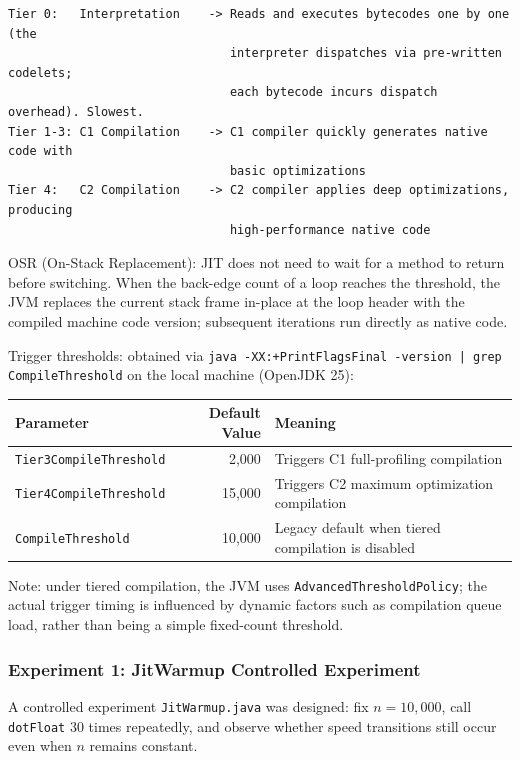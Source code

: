 \documentclass[12pt,a4paper]{article}
\begin{document}
\begin{lstlisting}
Tier 0:   Interpretation    -> Reads and executes bytecodes one by one (the
                               interpreter dispatches via pre-written codelets;
                               each bytecode incurs dispatch overhead). Slowest.
Tier 1-3: C1 Compilation    -> C1 compiler quickly generates native code with
                               basic optimizations
Tier 4:   C2 Compilation    -> C2 compiler applies deep optimizations, producing
                               high-performance native code
\end{lstlisting}

OSR (On-Stack Replacement): JIT does not need to wait for a method to return before switching. When the back-edge count of a loop reaches the threshold, the JVM replaces the current stack frame in-place at the loop header with the compiled machine code version; subsequent iterations run directly as native code.

Trigger thresholds: obtained via \texttt{java -XX:+PrintFlagsFinal -version | grep CompileThreshold} on the local machine (OpenJDK 25):

\begin{table}[H]
\centering
\begin{tabular}{l r l}
\toprule
Parameter & Default Value & Meaning \\
\midrule
\texttt{Tier3CompileThreshold} & 2{,}000 & Triggers C1 full-profiling compilation \\
\texttt{Tier4CompileThreshold} & 15{,}000 & Triggers C2 maximum optimization compilation \\
\texttt{CompileThreshold} & 10{,}000 & Legacy default when tiered compilation is disabled \\
\bottomrule
\end{tabular}
\end{table}

Note: under tiered compilation, the JVM uses \texttt{AdvancedThresholdPolicy}; the actual trigger timing is influenced by dynamic factors such as compilation queue load, rather than being a simple fixed-count threshold.

\subsubsection{Experiment 1: JitWarmup Controlled Experiment}

A controlled experiment \texttt{JitWarmup.java} was designed: fix $n=10{,}000$, call \texttt{dotFloat} 30 times repeatedly, and observe whether speed transitions still occur even when $n$ remains constant.
\end{document}
